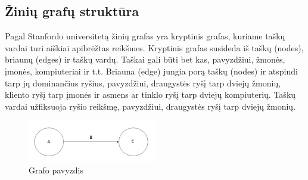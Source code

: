 \documentclass{VUMIFPSkursinis}
\begin{document}
\subsection{Žinių grafų struktūra}
Pagal Stanfordo universitetą žinių grafas yra kryptinis grafas, kuriame taškų vardai turi aiškiai apibrėžtas reikšmes. Kryptinis grafas susideda iš taškų (nodes), briaunų (edges) ir taškų vardų. Taškai gali būti bet kas, pavyzdžiui, žmonės, įmonės, kompiuteriai ir t.t. Briauna (edge) jungia porą taškų (nodes) ir atspindi tarp jų dominančius ryšius, pavyzdžiui, draugystės ryšį tarp dviejų žmonių, kliento ryšį tarp įmonės ir asmens ar tinklo ryšį tarp dviejų kompiuterių. Taškų vardai užfiksuoja ryšio reikšmę, pavyzdžiui, draugystės ryšį tarp dviejų žmonių.\cite{stanford_what_2021}

\begin{figure}[htbp]
  \centering
  \includegraphics[width=0.5\textwidth]{img/triple.jpg}
  \caption{Grafo pavyzdis \cite{stanford_image}}
  \label{fig:sample_image}
\end{figure}
\pagebreak
\end{document}
